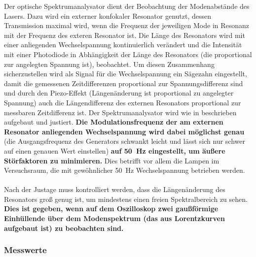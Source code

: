 \documentclass[11pt, a4paper]{article}
\numberwithin{equation}{section}
\begin{document}
Der optische Spektrumanalysator dient der Beobachtung der Modenabstände des Lasers.
Dazu wird ein externer konfokaler Resonator genutzt, dessen Transmission maximal wird, wenn die Frequenz der jeweiligen Mode in Resonanz mit der Frequenz des exteren Resonator ist.
Die Länge des Resonators wird mit einer anliegenden Wechselspannung kontinuierlich verändert und die Intensität mit einer Photodiode in Abhängigkeit der Länge des Resonators (die proportional zur angelegten Spannung ist), beobachtet.
Um diesen Zusammenhang sicherzustellen wird als Signal für die Wechselspannung ein Sägezahn eingestellt, damit die gemessenen Zeitdifferenzen proportional zur Spannungsdifferenz sind und durch den Piezo-Effekt (Längenänderung ist proportional zu angelegter Spannung) auch die Längendifferenz des externen Resonators proportional zur messbaren Zeitdifferenz ist.
Der Spektrumanalysator wird wie in \cite{anleitung} beschrieben aufgebaut und justiert.
\textbf{Die Modulationsfrequenz der am externen Resonator anliegenden Wechselspannung wird dabei möglichst genau} (die Ausgangsfrequenz des Generators schwankt leicht und lässt sich nur schwer auf einen genauen Wert einstellen) \textbf{auf \SI{50}{\hertz} eingestellt, um äußere Störfaktoren zu minimieren.}
Dies betrifft vor allem die Lampen im Versuchsraum, die mit gewöhnlicher \SI{50}{\hertz} Wechselspannung betrieben werden.\\
\\
Nach der Justage muss kontrolliert werden, dass die Längenänderung des Resonators groß genug ist, um mindestens einen freien Spektralbereich zu sehen.
\textbf{Dies ist gegeben, wenn auf dem Oszilloskop zwei gaußförmige Einhüllende über dem Modenspektrum (das aus Lorentzkurven aufgebaut ist) zu beobachten sind.}

\subsubsection{Messwerte}
\end{document}
